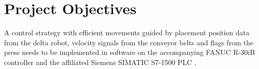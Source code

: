 
\chapter{Project Objectives}

A control strategy with efficient movements guided by placement position data from the delta robot, velocity signals from the conveyor belts and flags from the press needs to be implemented in software on the accompanying FANUC R-30iB controller and the affiliated Siemens SIMATIC S7-1500 PLC . 